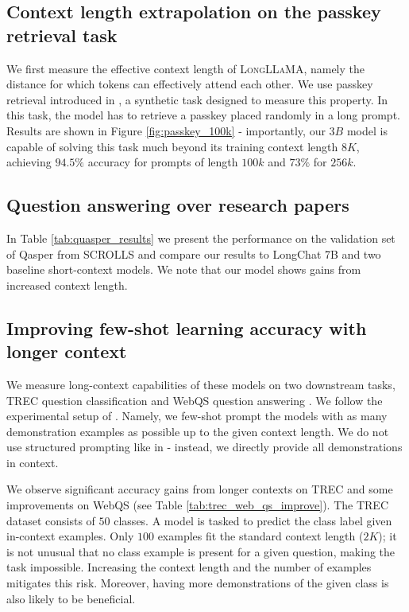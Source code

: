 \subsection{Context length extrapolation on the passkey retrieval task}

We first measure the effective context length of \textsc{LongLLaMA}, namely the distance for which tokens can effectively attend each other. We use passkey retrieval introduced in \citep{mohtashami2023landmark}, a synthetic task designed to measure this property. In this task, the model has to retrieve a passkey placed randomly in a long prompt. Results are shown in Figure \ref{fig:passkey_100k} - importantly, our $3B$ model is capable of solving this task much beyond its training context length $8K$, achieving $94.5\%$ accuracy for prompts of length $100k$ and $73\%$ for $256k$. 

\subsection{Question answering over research papers} In Table \ref{tab:quasper_results} we present the performance  on the validation set of Qasper \citep{dasigi2021dataset} from SCROLLS \citep{shaham2022scrolls} and compare our results to LongChat 7B \citep{longchat2023} and two baseline short-context models. We note that our model shows gains from increased context length.

\subsection{Improving few-shot learning accuracy with longer context} \label{sec:llama_fewshot}
 We measure long-context capabilities of these models on two downstream tasks, TREC question classification \citep{li-roth-2002-learning, hovy-etal-2001-toward} and WebQS question answering \citep{berant-etal-2013-semantic}. We follow the experimental setup of \citep{hao2022stuctured}. Namely,  we few-shot prompt the models with as many demonstration examples as possible up to the given context length. We do not use structured prompting like in \citep{hao2022stuctured} - instead, we directly provide all demonstrations in context. 

We observe significant accuracy gains from longer contexts on TREC and some improvements on WebQS (see Table \ref{tab:trec_web_qs_improve}). The TREC dataset consists of $50$ classes. A model is tasked to predict the class label given in-context examples. Only $100$ examples fit the standard context length ($2K$); it is not unusual that no class example is present for a given question, making the task impossible. Increasing the context length and the number of examples mitigates this risk. Moreover, having more demonstrations of the given class is also likely to be beneficial.

